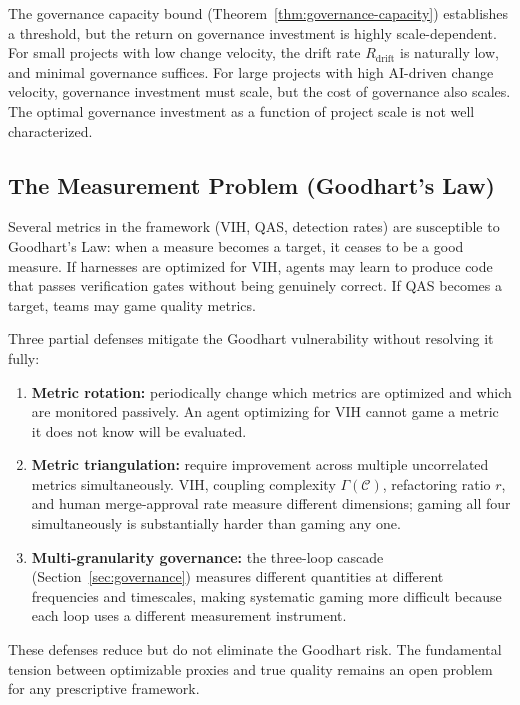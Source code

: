 \documentclass[11pt, a4paper]{googledeepmind}
\begin{document}
The governance capacity bound (Theorem~\ref{thm:governance-capacity}) establishes a threshold, but the return on governance investment is highly scale-dependent. For small projects with low change velocity, the drift rate $R_{\text{drift}}$ is naturally low, and minimal governance suffices. For large projects with high AI-driven change velocity, governance investment must scale, but the cost of governance also scales. The optimal governance investment as a function of project scale is not well characterized.

\subsection{The Measurement Problem (Goodhart's Law)}

Several metrics in the framework (VIH, QAS, detection rates) are susceptible to Goodhart's Law: when a measure becomes a target, it ceases to be a good measure. If harnesses are optimized for VIH, agents may learn to produce code that passes verification gates without being genuinely correct. If QAS becomes a target, teams may game quality metrics.

Three partial defenses mitigate the Goodhart vulnerability without resolving it fully:
\begin{enumerate}[nosep]
    \item \textbf{Metric rotation:} periodically change which metrics are optimized and which are monitored passively. An agent optimizing for VIH cannot game a metric it does not know will be evaluated.
    \item \textbf{Metric triangulation:} require improvement across multiple uncorrelated metrics simultaneously. VIH, coupling complexity $\Gamma(\mathcal{C})$, refactoring ratio $r$, and human merge-approval rate measure different dimensions; gaming all four simultaneously is substantially harder than gaming any one.
    \item \textbf{Multi-granularity governance:} the three-loop cascade (Section~\ref{sec:governance}) measures different quantities at different frequencies and timescales, making systematic gaming more difficult because each loop uses a different measurement instrument.
\end{enumerate}
These defenses reduce but do not eliminate the Goodhart risk. The fundamental tension between optimizable proxies and true quality remains an open problem for any prescriptive framework.


\end{document}
